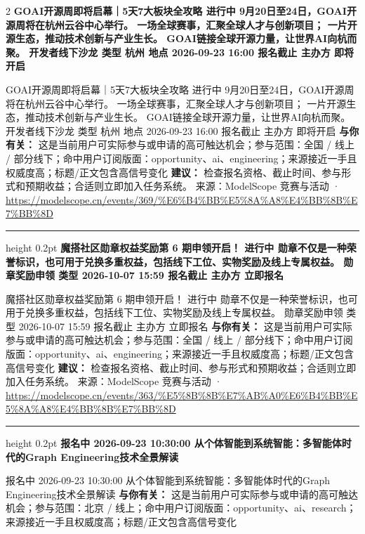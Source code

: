 \documentclass[10.5pt]{ctexart}
\begin{document}
\begin{multicols}{2}
{\large\bfseries GOAI开源周即将启幕｜5天7大板块全攻略 进行中 9月20日至24日，GOAI开源周将在杭州云谷中心举行。 一场全球赛事，汇聚全球人才与创新项目； 一片开源生态，推动技术创新与产业生长。 GOAI链接全球开源力量，让世界AI向杭而聚。 开发者线下沙龙 类型 杭州 地点 2026-09-23 16:00 报名截止 主办方 即将开启}\par
GOAI开源周即将启幕｜5天7大板块全攻略 进行中 9月20日至24日，GOAI开源周将在杭州云谷中心举行。 一场全球赛事，汇聚全球人才与创新项目； 一片开源生态，推动技术创新与产业生长。 GOAI链接全球开源力量，让世界AI向杭而聚。 开发者线下沙龙 类型 杭州 地点 2026-09-23 16:00 报名截止 主办方 即将开启
\textbf{与你有关：} 这是当前用户可实际参与或申请的高可触达机会；参与范围：全国 / 线上 / 部分线下；命中用户订阅版面：opportunity、ai、engineering；来源接近一手且权威度高；标题/正文包含高信号变化
\textbf{建议：} 检查报名资格、截止时间、参与形式和预期收益；合适则立即加入任务系统。
{\footnotesize\color{ormuted} 来源：ModelScope 竞赛与活动 · \url{https://modelscope.cn/events/369/%E6%B4%BB%E5%8A%A8%E4%BB%8B%E7%BB%8D}}
\vspace{2mm}
\hrule height 0.2pt
\vspace{2mm}
{\large\bfseries 魔搭社区勋章权益奖励第 6 期申领开启！ 进行中 勋章不仅是一种荣誉标识，也可用于兑换多重权益，包括线下工位、实物奖励及线上专属权益。 勋章奖励申领 类型 2026-10-07 15:59 报名截止 主办方 立即报名}\par
魔搭社区勋章权益奖励第 6 期申领开启！ 进行中 勋章不仅是一种荣誉标识，也可用于兑换多重权益，包括线下工位、实物奖励及线上专属权益。 勋章奖励申领 类型 2026-10-07 15:59 报名截止 主办方 立即报名
\textbf{与你有关：} 这是当前用户可实际参与或申请的高可触达机会；参与范围：全国 / 线上 / 部分线下；命中用户订阅版面：opportunity、ai、engineering；来源接近一手且权威度高；标题/正文包含高信号变化
\textbf{建议：} 检查报名资格、截止时间、参与形式和预期收益；合适则立即加入任务系统。
{\footnotesize\color{ormuted} 来源：ModelScope 竞赛与活动 · \url{https://modelscope.cn/events/363/%E5%8B%8B%E7%AB%A0%E6%B4%BB%E5%8A%A8%E4%BB%8B%E7%BB%8D}}
\vspace{2mm}
\hrule height 0.2pt
\vspace{2mm}
{\large\bfseries 报名中 2026-09-23 10:30:00 从个体智能到系统智能：多智能体时代的Graph Engineering技术全景解读}\par
报名中 2026-09-23 10:30:00 从个体智能到系统智能：多智能体时代的Graph Engineering技术全景解读
\textbf{与你有关：} 这是当前用户可实际参与或申请的高可触达机会；参与范围：北京 / 线上；命中用户订阅版面：opportunity、ai、research；来源接近一手且权威度高；标题/正文包含高信号变化

\end{multicols}
\end{document}
